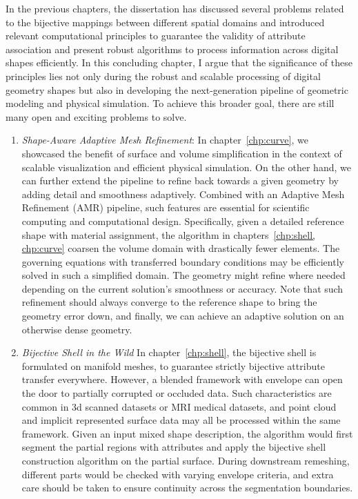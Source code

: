 In the previous chapters, the dissertation has discussed several problems related to the bijective mappings between different spatial domains and introduced relevant computational principles to guarantee the validity of attribute association and present robust algorithms to process information across digital shapes efficiently. 
In this concluding chapter, I argue that the significance of these principles lies not only during the robust and scalable processing of digital geometry shapes but also in developing the next-generation pipeline of geometric modeling and physical simulation. 
To achieve this broader goal, there are still many open and exciting problems to solve.

\begin{enumerate}
  \item \emph{Shape-Aware Adaptive Mesh Refinement}:
In chapter~\ref{chp:curve}, we showcased the benefit of surface and volume simplification in the context of scalable visualization and efficient physical simulation. 
On the other hand, we can further extend the pipeline to refine back towards a given geometry by adding detail and smoothness adaptively. Combined with an Adaptive Mesh Refinement (AMR) pipeline, such features are essential for scientific computing and computational design.
Specifically, given a detailed reference shape with material assignment, the algorithm in chapters~\ref{chp:shell, chp:curve} coarsen the volume domain with drastically fewer elements. 
The governing equations with transferred boundary conditions may be efficiently solved in such a simplified domain. The geometry might refine where needed depending on the current solution's smoothness or accuracy. 
Note that such refinement should always converge to the reference shape to bring the geometry error down, and finally, we can achieve an adaptive solution on an otherwise dense geometry. 

\item \emph{Bijective Shell in the Wild} %
In chapter~\ref{chp:shell}, the bijective shell is formulated on manifold meshes, 
to guarantee strictly bijective attribute transfer everywhere.
However, a blended framework with envelope \cite{hu2018tetrahedral, Wang:2021} can open the door to partially corrupted or occluded data. 
Such characteristics are common in 3d scanned datasets or MRI medical datasets, and point cloud and implicit represented surface data may all be processed within the same framework.
Given an input mixed shape description, the algorithm would first segment the partial regions with attributes and apply the bijective shell construction algorithm on the partial surface. During downstream remeshing, different parts would be checked with varying envelope criteria, and extra care should be taken to ensure continuity across the segmentation boundaries. 


\end{enumerate}

